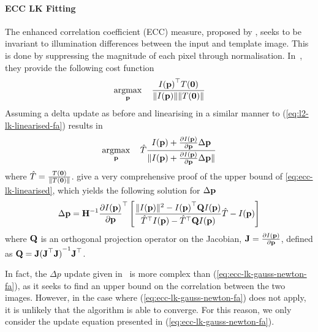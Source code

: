 \paragraph{ECC LK Fitting}\label{subsubsec:lk-ecc}
The enhanced correlation coefficient (ECC) measure, proposed by
\citet{RefWorks:59}, seeks to be invariant to illumination differences
between the input and template image. This is done by suppressing the magnitude
of each pixel through normalisation. In~\cite{RefWorks:59}, they provide the
following cost function
\begin{equation}\label{eq:ecc-lk-max}
   \argmax_{\p} \quad \frac{{I(\p)}^{\top} T(\zero)}{\norm{I(\p)} \norm{T(\zero)}}
\end{equation}
Assuming a delta update as before and linearising in a similar manner to
(\ref{eq:l2-lk-linearised-fa}) results in
\begin{equation}\label{eq:ecc-lk-linearised}
    \argmax_{\p} \quad \hat{T} \frac{I(\p) + \frac{\partial I(\p)}{\partial \p} \Delta \p}{\norm{{I(\p) + \frac{\partial I(\p)}{\partial \p} \Delta \p}}}
\end{equation}
where $\hat{T} = \frac{T(\boldsymbol{\mathbf{0}})}{\lVert{} T(\boldsymbol{\mathbf{0}}) \rVert}$.
\citet{RefWorks:59} give a very comprehensive proof of
the upper bound of \cref{eq:ecc-lk-linearised}, which yields the
following solution for $\Delta \boldsymbol{\mathbf{p}}$
\begin{equation}\label{eq:ecc-lk-gauss-newton-fa}
    \Delta \boldsymbol{\mathbf{p}} = \boldsymbol{\mathbf{H}}^{-1} \frac{\partial I(\boldsymbol{\mathbf{p}})}{\partial \boldsymbol{\mathbf{p}}}^{\top} \left[ \frac{\lVert{} I(\boldsymbol{\mathbf{p}}) \rVert^2 - {I(\boldsymbol{\mathbf{p}})}^{\top} \boldsymbol{\mathbf{Q}} I(\boldsymbol{\mathbf{p}})}{\hat{T}^{\top} I(\boldsymbol{\mathbf{p}}) - \hat{T}^{\top} \boldsymbol{\mathbf{Q}} I(\boldsymbol{\mathbf{p}})} \hat{T} - I(\boldsymbol{\mathbf{p}}) \right]
\end{equation}
where $\boldsymbol{\mathbf{Q}}$ is an orthogonal projection operator on the Jacobian, $\boldsymbol{\mathbf{J}} =
\frac{\partial I(\boldsymbol{\mathbf{p}})}{\partial \boldsymbol{\mathbf{p}}}$, defined as $\boldsymbol{\mathbf{Q}} = \boldsymbol{\mathbf{J}} {(\boldsymbol{\mathbf{J}}^\top
\boldsymbol{\mathbf{J}})}^{-1} \boldsymbol{\mathbf{J}}^\top$.

In fact, the $\Delta p$ update given in~\cite{RefWorks:59} is more complex than
(\ref{eq:ecc-lk-gauss-newton-fa}), as it seeks to find an upper bound on the
correlation between the two images. However, in the case where 
(\ref{eq:ecc-lk-gauss-newton-fa}) does not apply, it is unlikely that the 
algorithm is able to converge. For this reason, we only consider the update 
equation presented in (\ref{eq:ecc-lk-gauss-newton-fa}).
